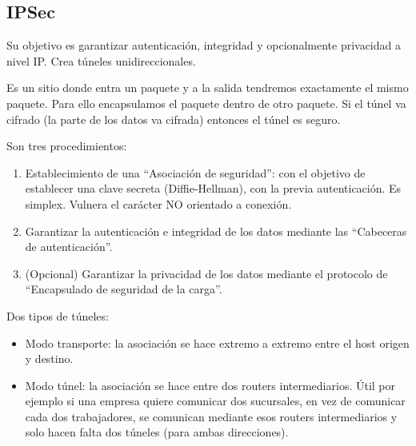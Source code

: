 \subsection{IPSec}
Su objetivo es garantizar autenticación, integridad y opcionalmente privacidad a nivel IP\@. Crea túneles unidireccionales. 

\begin{definicion}[Túnel]
    Es un sitio donde entra un paquete y a la salida tendremos exactamente el mismo paquete. Para ello encapsulamos el paquete dentro de otro paquete. Si el túnel va cifrado (la parte de los datos va cifrada) entonces el túnel es seguro.
\end{definicion}

Son tres procedimientos:
\begin{enumerate}
    \item Establecimiento de una ``Asociación de seguridad'': con el objetivo de establecer una clave secreta (Diffie-Hellman), con la previa autenticación. Es simplex. Vulnera el carácter NO orientado a conexión. 
    \item Garantizar la autenticación e integridad de los datos mediante las ``Cabeceras de autenticación''.
    \item (Opcional) Garantizar la privacidad de los datos mediante el protocolo de ``Encapsulado de seguridad de la carga''.
\end{enumerate}

Dos tipos de túneles:
\begin{itemize}
    \item Modo transporte: la asociación se hace extremo a extremo entre el host origen y destino.
    \item Modo túnel: la asociación se hace entre dos routers intermediarios. Útil por ejemplo si una empresa quiere comunicar dos sucursales, en vez de comunicar cada dos trabajadores, se comunican mediante esos routers intermediarios y solo hacen falta dos túneles (para ambas direcciones).
\end{itemize}


